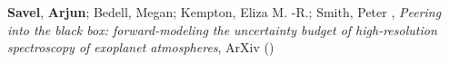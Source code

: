 \item[{\color{numcolor}\scriptsize1}] \textbf{Savel}, \textbf{Arjun}; Bedell, Megan; Kempton, Eliza M. -R.; Smith, Peter , \emph{Peering into the black box: forward-modeling the uncertainty budget of high-resolution spectroscopy of exoplanet atmospheres}, ArXiv ()